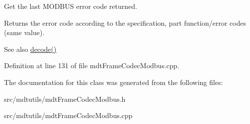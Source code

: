 Get the last MODBUS error code returned. 

Returns the error code according to the specification, part function/error codes (same value). \begin{DoxySeeAlso}{See also}
\hyperlink{classmdt_frame_codec_modbus_a426f465363a49d70890a462b40677787}{decode()} 
\end{DoxySeeAlso}


Definition at line 131 of file mdtFrameCodecModbus.cpp.



The documentation for this class was generated from the following files:\begin{DoxyCompactItemize}
\item 
src/mdtutils/mdtFrameCodecModbus.h\item 
src/mdtutils/mdtFrameCodecModbus.cpp\end{DoxyCompactItemize}
